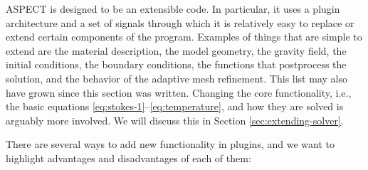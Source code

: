 \documentclass{article}
\newcommand{\aspect}{\textsc{ASPECT}}
\begin{document}
\aspect{} is designed to be an extensible code. In particular, it
uses a plugin architecture and a set of signals through which it is
relatively easy to replace or extend certain components of the program. Examples of
things that are simple to extend are the material description, the model geometry,
the gravity field, the initial conditions, the boundary conditions,
the functions that postprocess the solution, and the behavior of the adaptive mesh refinement.
This list may also have grown since this section was written. Changing the core functionality, i.e., the basic equations
\eqref{eq:stokes-1}--\eqref{eq:temperature}, and how they are solved is
arguably more involved. We will discuss this in Section
\ref{sec:extending-solver}.

There are several ways to add new functionality in plugins, and we want to highlight advantages
and disadvantages of each of them:
\end{document}
